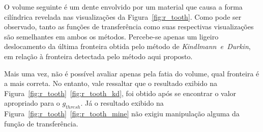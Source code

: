 	O volume seguinte é um dente envolvido por um material que causa a forma cilíndrica revelada nas visualizações da Figura~\ref{fig:r_tooth}. Como pode ser observado, tanto as funções de transferência como suas respectivas visualizações são semelhantes em ambos os métodos. Percebe-se apenas um ligeiro deslocamento da última fronteira obtida pelo método de \textit{Kindlmann~e~Durkin}, em relação à fronteira detectada  pelo método aqui proposto.
	
	Mais uma vez, não é possível avaliar apenas pela fatia do volume, qual fronteira é a mais correta. No entanto, vale ressaltar que o resultado exibido na Figura~\ref{fig:r_tooth}~\ref{fig:r_tooth_kd}, foi obtido após se encontrar o valor apropriado para o $ g_{thresh} $. Já o resultado exibido na Figura~\ref{fig:r_tooth}~\ref{fig:r_tooth_mine} não exigiu manipulação alguma da função de transferência.
	
